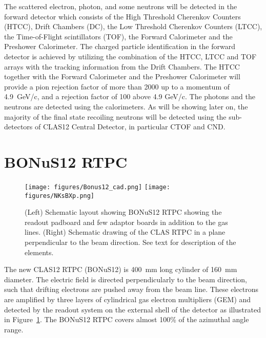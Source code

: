 The scattered electron, photon, and some neutrons will be detected in the 
forward detector which consists of the High Threshold Cherenkov Counters 
(HTCC), Drift Chambers (DC), the Low Threshold Cherenkov Counters (LTCC), the 
Time-of-Flight scintillators (TOF), the Forward Calorimeter and the Preshower 
Calorimeter. The charged particle identification in the forward detector is 
achieved by utilizing the combination of the HTCC, LTCC and TOF arrays with the 
tracking information from the Drift Chambers. The HTCC together with the 
Forward Calorimeter and the Preshower Calorimeter will provide a pion rejection 
factor of more than 2000 up to a momentum of 4.9~GeV/c, and a rejection factor 
of 100 above 4.9 GeV/c. The photons and the neutrons are detected using the 
calorimeters. As will be showing later on, the majority of the final state 
recoiling neutrons will be detected using the sub-detectors of CLAS12 Central 
Detector, in particular CTOF and CND. 

\section{BONuS12 RTPC} 

\begin{figure}
  \begin{center}
    \texttt{[image: figures/Bonus12\_cad.png]}
    \texttt{[image: figures/NKsBXp.png]}
     \caption{(Left) Schematic layout showing BONuS12 RTPC showing the readout 
     padboard and few adaptor boards in addition to the gas lines. (Right) 
     Schematic drawing of the CLAS RTPC in a plane perpendicular to the beam 
     direction. See text for description of the elements.}
    \label{fig:bonus12}
  \end{center}
\end{figure}

The new CLAS12 RTPC (BONuS12) is 400~mm long cylinder of 160~mm diameter. The 
electric field is directed perpendicularly to the beam direction, such that 
drifting electrons are pushed away from the beam line.  These electrons are 
amplified by three layers of cylindrical gas electron multipliers (GEM) and 
detected by the readout system on the external shell of the detector as 
illustrated in Figure~\ref{fig:bonus12}. The BONuS12 RTPC covers almost 100\% 
of the azimuthal angle range.

